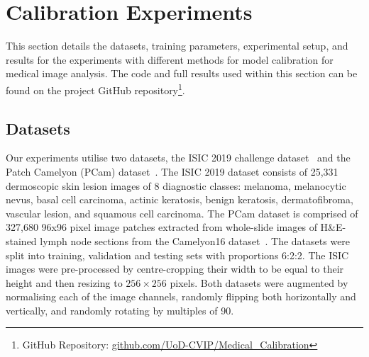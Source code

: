 \section{Calibration Experiments}
\label{sec:calibration_experiments}
This section details the datasets, training parameters, experimental setup, and results for the experiments with different methods for model calibration for medical image analysis. The code and full results used within this section can be found on the project GitHub repository\footnote{GitHub Repository: \url{github.com/UoD-CVIP/Medical_Calibration}}.


\subsection{Datasets}\begin{flushleft}
	
\end{flushleft}
Our experiments utilise two datasets, the ISIC 2019 challenge dataset~\citep{codella2018skin,combalia2019bcn20000,tschandl2018ham10000} and the Patch Camelyon (PCam) dataset~\citep{veeling2018rotation}. The ISIC 2019 dataset consists of 25,331 dermoscopic skin lesion images of 8 diagnostic classes: melanoma, melanocytic nevus, basal cell carcinoma, actinic keratosis, benign keratosis, dermatofibroma, vascular lesion, and squamous cell carcinoma. The PCam dataset is comprised of 327,680 96x96 pixel image patches extracted from whole-slide images of H\&E-stained lymph node sections from the Camelyon16 dataset~\citep{bejnordi2017diagnostic}. The datasets were split into training, validation and testing sets with proportions 6:2:2. The ISIC images were pre-processed by centre-cropping their width to be equal to their height and then resizing to $256 \times 256$ pixels. Both datasets were augmented by normalising each of the image channels, randomly flipping both horizontally and vertically, and randomly rotating by multiples of 90\textdegree.


